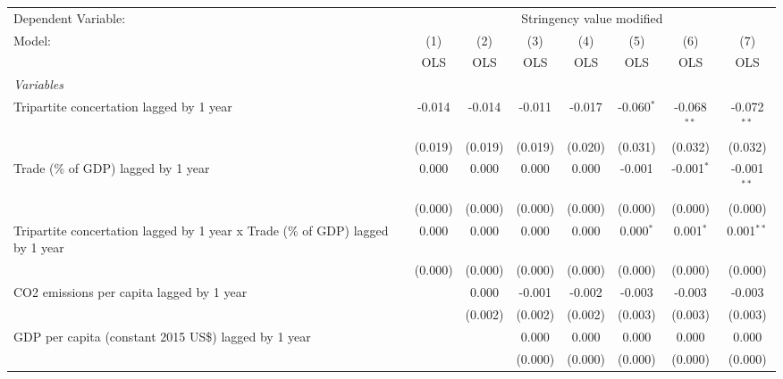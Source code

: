 
\begingroup
\centering
\begin{tabular}{lccccccc}
   \toprule
   Dependent Variable: & \multicolumn{7}{c}{Stringency value modified}\\
   Model:                                                                         & (1)     & (2)     & (3)     & (4)     & (5)          & (6)           & (7)\\  
                                                                                  &  OLS    & OLS     & OLS     & OLS     & OLS          & OLS           & OLS\\  
   \midrule
   \emph{Variables}\\
   Tripartite concertation lagged by 1 year                                       & -0.014  & -0.014  & -0.011  & -0.017  & -0.060$^{*}$ & -0.068$^{**}$ & -0.072$^{**}$\\   
                                                                                  & (0.019) & (0.019) & (0.019) & (0.020) & (0.031)      & (0.032)       & (0.032)\\   
   Trade (\% of GDP) lagged by 1 year                                             & 0.000   & 0.000   & 0.000   & 0.000   & -0.001       & -0.001$^{*}$  & -0.001$^{**}$\\   
                                                                                  & (0.000) & (0.000) & (0.000) & (0.000) & (0.000)      & (0.000)       & (0.000)\\   
   Tripartite concertation lagged by 1 year x Trade (\% of GDP) lagged by 1 year  & 0.000   & 0.000   & 0.000   & 0.000   & 0.000$^{*}$  & 0.001$^{*}$   & 0.001$^{**}$\\   
                                                                                  & (0.000) & (0.000) & (0.000) & (0.000) & (0.000)      & (0.000)       & (0.000)\\   
   CO2 emissions per capita lagged by 1 year                                      &         & 0.000   & -0.001  & -0.002  & -0.003       & -0.003        & -0.003\\   
                                                                                  &         & (0.002) & (0.002) & (0.002) & (0.003)      & (0.003)       & (0.003)\\   
   GDP per capita (constant 2015 US\$) lagged by 1 year                           &         &         & 0.000   & 0.000   & 0.000        & 0.000         & 0.000\\   
                                                                                  &         &         & (0.000) & (0.000) & (0.000)      & (0.000)       & (0.000)\\   

\end{tabular}
